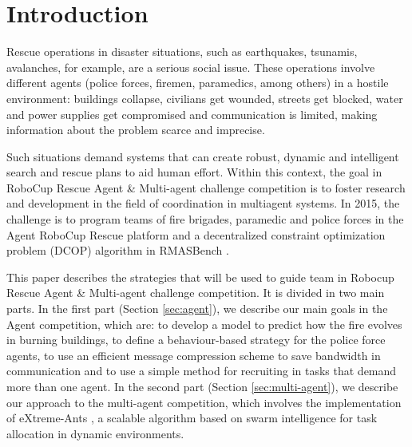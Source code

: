 \section{Introduction}
\label{sec:intro}

Rescue operations in disaster situations, such as earthquakes, tsunamis, avalanches, for example, are a serious social issue. These operations involve different agents (police forces, firemen, paramedics, among others) in a hostile environment: buildings collapse, civilians get wounded, streets get blocked, water and power supplies get compromised and communication is limited, making information about the problem scarce and imprecise.

Such situations demand systems that can create robust, dynamic and intelligent search and rescue plans to aid human effort. Within this context, the goal in RoboCup Rescue Agent \& Multi-agent challenge competition is to foster research and development in the field of coordination in multiagent systems. In 2015, the challenge is to program teams of fire brigades, paramedic and police forces in the Agent RoboCup Rescue platform \citep{Kitano2000} and a decentralized constraint optimization problem (DCOP) algorithm in RMASBench \citep{Kleiner+2013}. 


This paper describes the strategies that will be used to guide \teamname team in  Robocup Rescue Agent \& Multi-agent challenge competition. It is divided in two main parts. In the first part (Section \ref{sec:agent}), we describe our main goals in the Agent competition, which are: to develop a model to predict how the fire evolves in burning buildings, to define a behaviour-based strategy for the police force agents, to use an efficient message compression scheme to save bandwidth in communication and to use a simple  method for recruiting in tasks that demand more than one agent. In the second part (Section \ref{sec:multi-agent}), we describe our approach to the multi-agent competition, which involves the implementation of eXtreme-Ants \citep{Santos&Bazzan2009optmas}, a scalable algorithm based on swarm intelligence for task allocation in dynamic environments.
